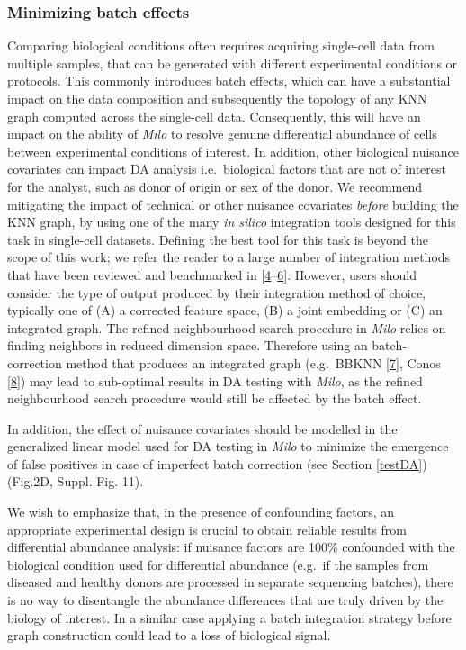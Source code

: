 \documentclass[
]{article}
\begin{document}
\hypertarget{minimizing-batch-effects}{%
\subsubsection{Minimizing batch effects}\label{minimizing-batch-effects}}

Comparing biological conditions often requires acquiring single-cell data from multiple samples, that can be generated with different experimental conditions or protocols. This commonly introduces batch effects, which can have a substantial impact on the data composition and subsequently the topology of any KNN graph computed across the single-cell data. Consequently, this will have an impact on the ability of \emph{Milo} to resolve genuine differential abundance of cells between experimental conditions of interest. In addition, other biological nuisance covariates can impact DA analysis i.e.~biological factors that are not of interest for the analyst, such as donor of origin or sex of the donor. We recommend mitigating the impact of technical or other nuisance covariates \emph{before} building the KNN graph, by using one of the many \emph{in silico} integration tools designed for this task in single-cell datasets.
Defining the best tool for this task is beyond the scope of this work; we refer the reader to a large number of integration methods that have been reviewed and benchmarked in {[}\protect\hyperlink{ref-lueckenBenchmarkingAtlaslevelData2020}{4}--\protect\hyperlink{ref-tranBenchmarkBatcheffectCorrection2020}{6}{]}. However, users should consider the type of output produced by their integration method of choice, typically one of (A) a corrected feature space, (B) a joint embedding or (C) an integrated graph. The refined neighbourhood search procedure in \emph{Milo} relies on finding neighbors in reduced dimension space. Therefore using an batch-correction method that produces an integrated graph (e.g.~BBKNN {[}\protect\hyperlink{ref-polanskiBBKNNFastBatch}{7}{]}, Conos {[}\protect\hyperlink{ref-barkasJointAnalysisHeterogeneous2019}{8}{]}) may lead to sub-optimal results in DA testing with \emph{Milo}, as the refined neighbourhood search procedure would still be affected by the batch effect.

In addition, the effect of nuisance covariates should be modelled in the generalized linear model used for DA testing in \emph{Milo} to minimize the emergence of false positives in case of imperfect batch correction (see Section \ref{testDA}) (Fig.2D, Suppl. Fig. 11).

We wish to emphasize that, in the presence of confounding factors, an appropriate experimental design is crucial to obtain reliable results from differential abundance analysis: if nuisance factors are 100\% confounded with the biological condition used for differential abundance (e.g.~if the samples from diseased and healthy donors are processed in separate sequencing batches), there is no way to disentangle the abundance differences that are truly driven by the biology of interest. In a similar case applying a batch integration strategy before graph construction could lead to a loss of biological signal.
\end{document}
